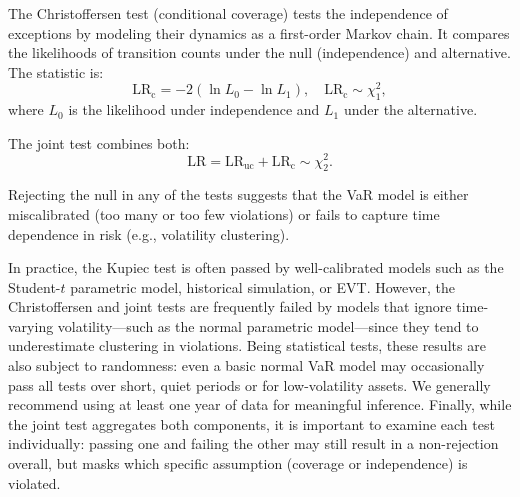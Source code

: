 \documentclass[12pt]{article}
\begin{document}
The Christoffersen test (conditional coverage) tests the independence of exceptions by modeling their dynamics as a first-order Markov chain. It compares the likelihoods of transition counts under the null (independence) and alternative. The statistic is:
\[
\text{LR}_{\text{c}} = -2 (\ln L_0 - \ln L_1), \quad \text{LR}_{\text{c}} \sim \chi^2_1,
\]
where $L_0$ is the likelihood under independence and $L_1$ under the alternative.

The joint test combines both:
\[
\text{LR} = \text{LR}_{\text{uc}} + \text{LR}_{\text{c}} \sim \chi^2_2.
\]

Rejecting the null in any of the tests suggests that the VaR model is either miscalibrated (too many or too few violations) or fails to capture time dependence in risk (e.g., volatility clustering).

In practice, the Kupiec test is often passed by well-calibrated models such as the Student-$t$ parametric model, historical simulation, or EVT. However, the Christoffersen and joint tests are frequently failed by models that ignore time-varying volatility—such as the normal parametric model—since they tend to underestimate clustering in violations. Being statistical tests, these results are also subject to randomness: even a basic normal VaR model may occasionally pass all tests over short, quiet periods or for low-volatility assets. We generally recommend using at least one year of data for meaningful inference. Finally, while the joint test aggregates both components, it is important to examine each test individually: passing one and failing the other may still result in a non-rejection overall, but masks which specific assumption (coverage or independence) is violated.
\end{document}
